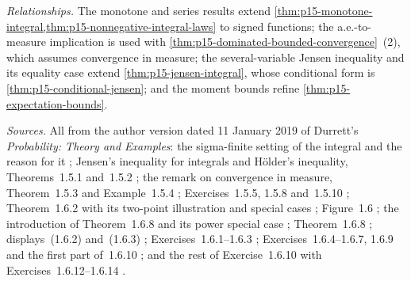 \emph{Relationships.} The monotone and series results extend
\cref{thm:p15-monotone-integral,thm:p15-nonnegative-integral-laws} to
signed functions; the a.e.-to-measure implication is used with
\cref{thm:p15-dominated-bounded-convergence}~(2), which assumes
convergence in measure; the several-variable Jensen inequality and its
equality case extend \cref{thm:p15-jensen-integral}, whose
conditional form is \cref{thm:p15-conditional-jensen}; and the
moment bounds refine \cref{thm:p15-expectation-bounds}.

\emph{Sources.} All from the author version dated 11 January 2019 of
Durrett's \emph{Probability: Theory and Examples}: the sigma-finite
setting of the integral and the reason for it
\cite[sec.~1.4, p.~18]{DurrettPTEAuthor2019}; Jensen's inequality
for integrals and H\"older's inequality, Theorems~1.5.1 and~1.5.2
\cite[p.~25]{DurrettPTEAuthor2019}; the remark on convergence in
measure, Theorem~1.5.3 and Example~1.5.4
\cite[p.~26]{DurrettPTEAuthor2019};
Exercises~1.5.5, 1.5.8 and~1.5.10 \cite[p.~28]{DurrettPTEAuthor2019};
Theorem~1.6.2 with its two-point illustration and special cases
\cite[p.~29]{DurrettPTEAuthor2019}; Figure~1.6
\cite[p.~30]{DurrettPTEAuthor2019}; the introduction of Theorem~1.6.8
and its power special case \cite[p.~30]{DurrettPTEAuthor2019};
Theorem~1.6.8 \cite[p.~31]{DurrettPTEAuthor2019}; displays~(1.6.2) and~(1.6.3)
\cite[p.~33]{DurrettPTEAuthor2019}; Exercises~1.6.1--1.6.3
\cite[p.~35]{DurrettPTEAuthor2019}; Exercises~1.6.4--1.6.7, 1.6.9
and the first part of~1.6.10 \cite[p.~36]{DurrettPTEAuthor2019}; and
the rest of Exercise~1.6.10 with Exercises~1.6.12--1.6.14
\cite[p.~37]{DurrettPTEAuthor2019}.
